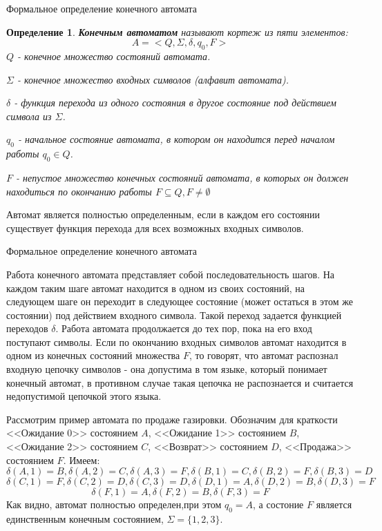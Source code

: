 \documentclass[12pt, pdf, hyperref={unicode},handout]{beamer}
\newtheorem{dfn}{Определение}
\begin{document}
\begin{frame}{Формальное определение конечного автомата}
  \begin{block}

    \small{
      \begin{dfn}
        \textbf{Конечным автоматом} называют кортеж из пяти элементов:
        $$A=<Q, \Sigma, \delta, q_0, F>$$
        $Q$ - конечное множество состояний автомата.

        $\Sigma$ - конечное множество входных символов (алфавит автомата).

        $\delta$ - функция перехода из одного состояния в другое состояние под действием символа из $\Sigma$.

        $q_0$ - начальное состояние автомата, в котором он находится перед началом работы $q_0\in Q$.

        $F$ - непустое множество конечных состояний автомата, в которых он должен находиться по окончанию работы $F\subseteq Q, F\neq \emptyset$
        \end{dfn}
     Автомат является полностью определенным, если в каждом его состоянии существует функция перехода для всех возможных входных символов. 
}

  \end{block}
  
\end{frame}

\begin{frame}{Формальное определение конечного автомата}
  \begin{block}

    \small{
      Работа конечного автомата представляет собой последовательность шагов. На каждом таким шаге автомат находится в одном из своих состояний, на следующем шаге он переходит в следующее состояние (может остаться в этом же состоянии) под действием входного символа. Такой переход задается функцией переходов $\delta$. Работа автомата продолжается до тех пор, пока на его вход поступают символы. Если по окончанию входных символов автомат находится в одном из конечных состояний множества $F$, то говорят, что автомат распознал входную цепочку символов - она допустима в том языке, который понимает конечный автомат, в противном случае такая цепочка не распознается и считается недопустимой цепочкой этого языка.

      Рассмотрим пример автомата по продаже газировки. Обозначим для краткости <<Ожидание 0>> состоянием $A$,  <<Ожидание 1>> состоянием $B$, <<Ожидание 2>> состоянием $C$, <<Возврат>> состоянием $D$, <<Продажа>> состоянием $F$. Имеем:
      $$\delta(A,1)=B, \delta(A,2)=C, \delta(A,3)=F, \delta(B,1)=C, \delta(B,2)=F, \delta(B,3)=D$$
      $$\delta(C,1)=F, \delta(C,2)=D, \delta(C,3)=D, \delta(D,1)=A, \delta(D,2)=B, \delta(D,3)=F$$
      $$\delta(F,1)=A, \delta(F,2)=B, \delta(F,3)=F$$
      Как видно, автомат полностью определен,при этом $q_0=A$, а состоние $F$ является единственным конечным состоянием, $\Sigma=\{1,2,3\}$.
}

  \end{block}
  
\end{frame}
\end{document}
